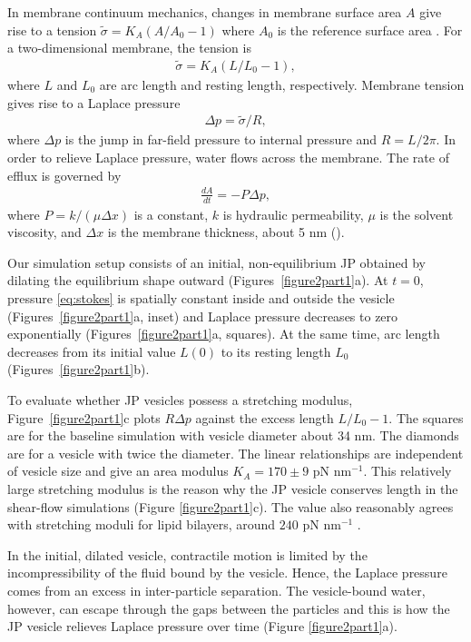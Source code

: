 \documentclass[lineno]{jfm}
\begin{document}
In membrane continuum  mechanics, changes in membrane surface area $A$ give rise to a tension
$\tilde \sigma = K_A(A/A_0 - 1)$ where $A_0$ is the reference surface area \cite{NaTr00}. 
For a two-dimensional membrane, the tension is 
\begin{align}
\label{eq:stretch}
\tilde \sigma = K_A\left(L/L_0 - 1 \right),
\end{align}
where $L$ and $L_0$ are arc length and resting length,
respectively. 
Membrane tension gives rise to 
a Laplace pressure 
\begin{align}
\label{eq:LaplacePressure}
\Delta p = \tilde \sigma/R,
\end{align}
where $\Delta p$ is the jump in far-field pressure to internal pressure and
$R = L/2\pi$.
In order to relieve Laplace pressure, 
water flows across the membrane. The rate of efflux is governed by  
\begin{align}
  \label{eq:perm} 
  \frac{dA}{dt} = - P\Delta p,
\end{align}
where $P = k/(\mu \Delta x)$ is a constant, $k$ is hydraulic permeability, 
$\mu$ is the solvent viscosity, and $\Delta x$ is the 
membrane thickness, about 5 nm
(\cite{chabanon2017, qua-gan-you2021}).

Our  simulation setup consists of an initial, non-equilibrium JP
obtained by dilating the equilibrium shape outward (Figures~\ref{figure2part1}a).
At $t = 0$, pressure \eqref{eq:stokes} is spatially constant  inside and outside the vesicle 
(Figures~\ref{figure2part1}a, inset)
and Laplace pressure decreases to zero exponentially 
(Figures~\ref{figure2part1}a,  squares).  
At the same time, arc length decreases from its initial value $L(0)$ to its resting length $L_0$
(Figures~\ref{figure2part1}b).

To evaluate whether JP vesicles possess a stretching modulus,
Figure~\ref{figure2part1}c plots $R \Delta p$ against the excess length $L/L_0 - 1$.  The squares
are for the baseline simulation with vesicle diameter about 34 nm.  The diamonds 
are for a vesicle with twice the diameter.  The linear relationships 
are independent of vesicle size and give an area modulus $K_A = 170 \pm 9$ pN nm$^{-1}$.
 This relatively large stretching modulus is the reason why the JP vesicle conserves length in the 
shear-flow simulations (Figure \ref{figure2part1}c).
The value also reasonably agrees with stretching moduli for 
lipid bilayers, around $240$ pN nm$^{-1}$ \cite{NaTr00}.

 In the initial, dilated vesicle,
contractile motion is limited by the incompressibility of the 
fluid bound by the vesicle.  
Hence, the Laplace pressure 
comes from an excess in inter-particle separation.  The vesicle-bound water,
however, can escape through the gaps between the particles and this
is how the JP vesicle relieves Laplace pressure over time (Figure \ref{figure2part1}a).  
\end{document}
